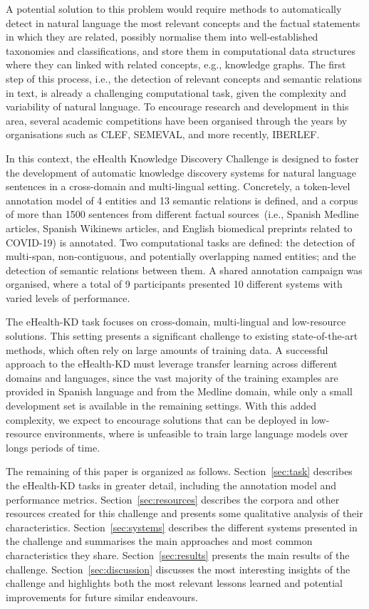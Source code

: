\documentclass[a4paper,11pt,twocolumn,twoside]{article}
\begin{document}
A potential solution to this problem would require methods to automatically detect in natural language the most relevant concepts and the factual statements in which they are related, possibly normalise them into well-established taxonomies and classifications, and store them in computational data structures where they can linked with related concepts, e.g., knowledge graphs.
The first step of this process, i.e., the detection of relevant concepts and semantic relations in text, is already a challenging computational task, given the complexity and variability of natural language.
To encourage research and development in this area, several academic competitions have been organised through the years by organisations such as CLEF, SEMEVAL, and more recently, IBERLEF.

In this context, the eHealth Knowledge Discovery Challenge is designed to foster the development of automatic knowledge discovery systems for natural language sentences in a cross-domain and multi-lingual setting.
Concretely, a token-level annotation model of 4 entities and 13 semantic relations is defined, and a corpus of more than 1500 sentences from different factual sources~(i.e., Spanish Medline articles, Spanish Wikinews articles, and English biomedical preprints related to COVID-19) is annotated.
Two computational tasks are defined: the detection of multi-span, non-contiguous, and potentially overlapping named entities; and the detection of semantic relations between them.
A shared annotation campaign was organised, where a total of 9 participants presented 10 different systems with varied levels of performance.

The eHealth-KD task focuses on cross-domain, multi-lingual and low-resource solutions. This setting presents a significant challenge to existing state-of-the-art methods, which often rely on large amounts of training data.
A successful approach to the eHealth-KD must leverage transfer learning across different domains and languages, since the vast majority of the training examples are provided in Spanish language and from the Medline domain, while only a small development set is available in the remaining settings.
With this added complexity, we expect to encourage solutions that can be deployed in low-resource environments, where is unfeasible to train large language models over longs periods of time.

The remaining of this paper is organized as follows.
Section~\ref{sec:task} describes the eHealth-KD tasks in greater detail, including the annotation model and performance metrics.
Section~\ref{sec:resources} describes the corpora and other resources created for this challenge and presents some qualitative analysis of their characteristics.
Section~\ref{sec:systems} describes the different systems presented in the challenge and summarises the main approaches and most common characteristics they share.
Section~\ref{sec:results} presents the main results of the challenge.
Section~\ref{sec:discussion} discusses the most interesting insights of the challenge and highlights both the most relevant lessons learned and potential improvements for future similar endeavours.
\end{document}
